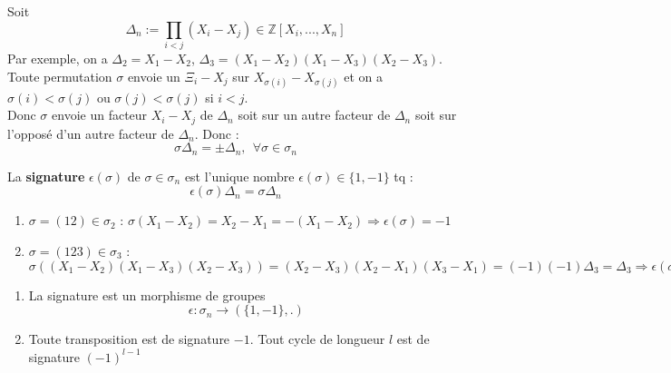 \documentclass[a4paper, oneside]{report}
\theoremstyle{break}
\newcommand{\Z}{\mathbb{Z}}
\begin{document}
Soit 
$$\Delta_n := \prod_{i<j}(X_i-X_j)\in \Z[X_i,...,X_n]$$
Par exemple, on a $\Delta_2=X_1-X_2$, $\Delta_3=(X_1-X_2)(X_1-X_3)(X_2-X_3)$.\\
Toute permutation $\sigma$ envoie un $\Xi_i-X_j$ sur $X_{\sigma(i)}-X_{\sigma(j)}$ et on a $\sigma(i)<\sigma(j)$ ou $\sigma(j)<\sigma(j)$ si $i<j$.\\
Donc $\sigma$ envoie un facteur $X_i-X_j$ de $\Delta_n$ soit sur un autre facteur de $\Delta_n$ soit sur l'opposé d'un autre facteur de $\Delta_n$. Donc :
$$\sigma \Delta_n=\pm \Delta_n,~~\forall\sigma\in \sigma_n$$

La \textbf{signature} $\epsilon(\sigma)$ de $\sigma\in \sigma_n$ est l'unique nombre $\epsilon(\sigma)\in \{1,-1\}$ tq :
$$\epsilon(\sigma)\Delta_n=\sigma\Delta_n$$

\exem
\begin{enumerate}
\item $\sigma = (12)\in \sigma_2$ : $\sigma(X_1-X_2)=X_2-X_1=-(X_1-X_2)\Rightarrow \epsilon(\sigma)=-1$
\item $\sigma=(123)\in \sigma_3$ : $\sigma((X_1-X_2)(X_1-X_3)(X_2-X_3))=(X_2-X_3)(X_2-X_1)(X_3-X_1)=(-1)(-1)\Delta_3=\Delta_3\Rightarrow \epsilon(\sigma)=1$
\end{enumerate}

\propr
\begin{enumerate}
\item La signature est un morphisme de groupes
$$ \epsilon : \sigma_n\rightarrow (\{1,-1\},.)$$

\item Toute transposition est de signature $-1$. Tout cycle de longueur $l$ est de signature $(-1)^{l-1}$
\end{enumerate}
\end{document}
